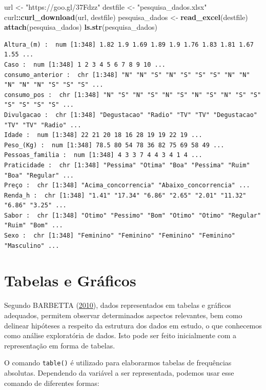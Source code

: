 \documentclass[12pt,brazil,oneside]{book}
\newenvironment{Shaded}{\begin{snugshade}}{\end{snugshade}}
\newcommand{\KeywordTok}[1]{\textcolor[rgb]{0.13,0.29,0.53}{\textbf{#1}}}
\newcommand{\NormalTok}[1]{#1}
\newcommand{\OperatorTok}[1]{\textcolor[rgb]{0.81,0.36,0.00}{\textbf{#1}}}
\newcommand{\StringTok}[1]{\textcolor[rgb]{0.31,0.60,0.02}{#1}}
\begin{document}
\begin{Shaded}
\begin{Highlighting}[]
\NormalTok{url <-}\StringTok{ "https://goo.gl/37Fdzz"}
\NormalTok{destfile <-}\StringTok{ "pesquisa_dados.xlsx"}
\NormalTok{curl}\OperatorTok{::}\KeywordTok{curl_download}\NormalTok{(url, destfile)}
\NormalTok{pesquisa_dados <-}\StringTok{ }\KeywordTok{read_excel}\NormalTok{(destfile)}
\KeywordTok{attach}\NormalTok{(pesquisa_dados)}
\KeywordTok{ls.str}\NormalTok{(pesquisa_dados)}
\end{Highlighting}
\end{Shaded}

\begin{verbatim}
Altura_(m) :  num [1:348] 1.82 1.9 1.69 1.89 1.9 1.76 1.83 1.81 1.67 1.55 ...
Caso :  num [1:348] 1 2 3 4 5 6 7 8 9 10 ...
consumo_anterior :  chr [1:348] "N" "N" "S" "N" "S" "S" "S" "N" "N" "N" "N" "N" "S" "S" "S" ...
consumo_pos :  chr [1:348] "N" "S" "N" "S" "N" "S" "N" "S" "N" "S" "S" "S" "S" "S" "S" ...
Divulgacao :  chr [1:348] "Degustacao" "Radio" "TV" "TV" "Degustacao" "TV" "TV" "Radio" ...
Idade :  num [1:348] 22 21 20 18 16 28 19 19 22 19 ...
Peso_(Kg) :  num [1:348] 78.5 80 54 78 36 82 75 69 58 49 ...
Pessoas_familia :  num [1:348] 4 3 3 7 4 4 3 4 1 4 ...
Praticidade :  chr [1:348] "Pessima" "Otima" "Boa" "Pessima" "Ruim" "Boa" "Regular" ...
Preço :  chr [1:348] "Acima_concorrencia" "Abaixo_concorrencia" ...
Renda_h :  chr [1:348] "1.41" "17.34" "6.86" "2.65" "2.01" "11.32" "6.86" "3.25" ...
Sabor :  chr [1:348] "Otimo" "Pessimo" "Bom" "Otimo" "Otimo" "Regular" "Ruim" "Bom" ...
Sexo :  chr [1:348] "Feminino" "Feminino" "Feminino" "Feminino" "Masculino" ...
\end{verbatim}

\hypertarget{tabelas-e-graficos}{%
\section{Tabelas e Gráficos}\label{tabelas-e-graficos}}

Segundo BARBETTA (\protect\hyperlink{ref-barbetta1988}{2010}), dados
representados em tabelas e gráficos adequados, permitem observar
determinados aspectos relevantes, bem como delinear hipóteses a respeito
da estrutura dos dados em estudo, o que conhecemos como análise
exploratória de dados. Isto pode ser feito inicialmente com a
representação em forma de tabelas.

O comando \texttt{table()} é utilizado para elaborarmos tabelas de
frequências absolutas. Dependendo da variável a ser representada,
podemos usar esse comando de diferentes formas:
\end{document}

